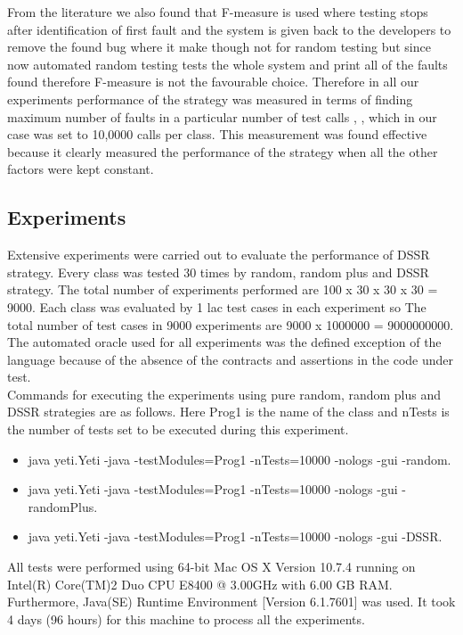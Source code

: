 \documentclass[conference]{IEEEtran}
\begin{document}
From the literature we also found that F-measure is used where testing stops after identification of first fault and the system is given back to the developers to remove the found bug where it make though not for random testing but since now automated random testing tests the whole system and print all of the faults found therefore F-measure is not the favourable choice. Therefore in all our experiments performance of the strategy was measured in terms of finding maximum number of faults in a particular number of test calls  \cite{Ciupa2007}, \cite{Pacheco2007a}, \cite{Ciupa2008b} which in our case was set to 10,0000 calls per class. This measurement was found effective because it clearly measured the performance of the strategy when all the other factors were kept constant.

\subsection{Experiments}
\indent Extensive experiments were carried out to evaluate the performance of DSSR strategy. Every class was tested 30 times by random, random plus and DSSR strategy. The total number of experiments performed are 100 x 30 x 30 x 30 = 9000. Each class was evaluated by 1 lac test cases in each experiment so The total number of test cases in 9000 experiments are  9000 x 1000000 = 9000000000. The automated oracle used for all experiments was the defined exception of the language because of the absence of the contracts and assertions in the code under test.\\
\indent Commands for executing the experiments using pure random, random plus and DSSR strategies are as follows. Here Prog1 is the name of the class and nTests is the number of tests set to be executed during this experiment.\\

\begingroup
    \fontsize{7pt}{10pt}\selectfont
\begin{itemize}
\item java yeti.Yeti -java -testModules=Prog1 -nTests=10000 -nologs -gui -random.
\item java yeti.Yeti -java -testModules=Prog1 -nTests=10000 -nologs -gui -randomPlus.
\item java yeti.Yeti -java -testModules=Prog1 -nTests=10000 -nologs -gui -DSSR.\\
\end{itemize}
\endgroup



All tests were performed using 64-bit Mac OS X Version 10.7.4 running on Intel(R) Core(TM)2 Duo CPU E8400 @ 3.00GHz with 6.00 GB RAM. Furthermore, Java(SE) Runtime Environment [Version 6.1.7601] was used. It took 4 days (96 hours) for this machine to process all the experiments.\\
\end{document}
